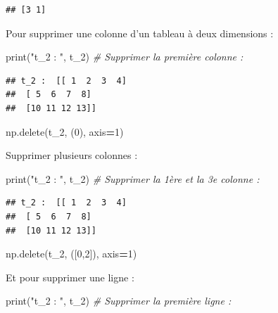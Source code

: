 \documentclass[12pt,]{book}
\newenvironment{Shaded}{\begin{snugshade}}{\end{snugshade}}
\newcommand{\DecValTok}[1]{\textcolor[rgb]{0.00,0.00,0.81}{#1}}
\newcommand{\StringTok}[1]{\textcolor[rgb]{0.31,0.60,0.02}{#1}}
\newcommand{\CommentTok}[1]{\textcolor[rgb]{0.56,0.35,0.01}{\textit{#1}}}
\newcommand{\OperatorTok}[1]{\textcolor[rgb]{0.81,0.36,0.00}{\textbf{#1}}}
\newcommand{\BuiltInTok}[1]{#1}
\newcommand{\NormalTok}[1]{#1}
\numberwithin{equation}{section}
\numberwithin{countremarque}{section}
\begin{document}
\begin{lstlisting}
## [3 1]
\end{lstlisting}

Pour supprimer une colonne d'un tableau à deux dimensions :

\begin{Shaded}
\begin{Highlighting}[]
\BuiltInTok{print}\NormalTok{(}\StringTok{"t_2 : "}\NormalTok{, t_2)}
\CommentTok{# Supprimer la première colonne :}
\end{Highlighting}
\end{Shaded}

\begin{lstlisting}
## t_2 :  [[ 1  2  3  4]
##  [ 5  6  7  8]
##  [10 11 12 13]]
\end{lstlisting}

\begin{Shaded}
\begin{Highlighting}[]
\NormalTok{np.delete(t_2, (}\DecValTok{0}\NormalTok{), axis}\OperatorTok{=}\DecValTok{1}\NormalTok{)}
\end{Highlighting}
\end{Shaded}

Supprimer plusieurs colonnes :

\begin{Shaded}
\begin{Highlighting}[]
\BuiltInTok{print}\NormalTok{(}\StringTok{"t_2 : "}\NormalTok{, t_2)}
\CommentTok{# Supprimer la 1ère et la 3e colonne :}
\end{Highlighting}
\end{Shaded}

\begin{lstlisting}
## t_2 :  [[ 1  2  3  4]
##  [ 5  6  7  8]
##  [10 11 12 13]]
\end{lstlisting}

\begin{Shaded}
\begin{Highlighting}[]
\NormalTok{np.delete(t_2, ([}\DecValTok{0}\NormalTok{,}\DecValTok{2}\NormalTok{]), axis}\OperatorTok{=}\DecValTok{1}\NormalTok{)}
\end{Highlighting}
\end{Shaded}

Et pour supprimer une ligne :

\begin{Shaded}
\begin{Highlighting}[]
\BuiltInTok{print}\NormalTok{(}\StringTok{"t_2 : "}\NormalTok{, t_2)}
\CommentTok{# Supprimer la première ligne :}
\end{Highlighting}
\end{Shaded}
\end{document}
